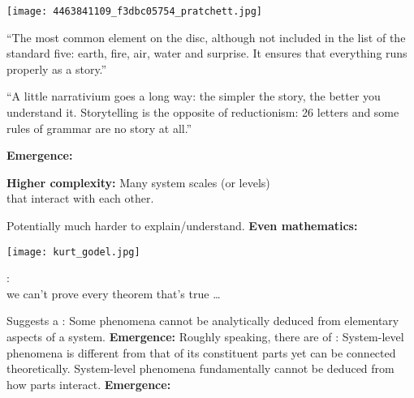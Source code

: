     \texttt{[image: 4463841109\_f3dbc05754\_pratchett.jpg]}
        
         
          ``The most common element on the disc, although not
          included in the list of the standard five: earth, fire, air,
          water and surprise. It ensures that everything runs properly
          as a story.''
        
          ``A little narrativium goes a long way: the simpler the story,
          the better you understand it. Storytelling is the opposite of
          reductionism: 26 letters and some rules of grammar are no story
          at all.''
    

  \textbf{Emergence:}

  \textbf{Higher complexity:}
      Many system scales (or levels) \\ 
      that
      interact with each other.
    
      Potentially much harder to explain/understand.
  \textbf{Even mathematics:\cite{foote2007a}}
      
      \texttt{[image: kurt\_godel.jpg]}
      
      :\\
      we can't prove every theorem that's true \ldots
  
      Suggests a :
      {
        Some phenomena cannot be analytically deduced
        from elementary aspects of a system.
      }
  \textbf{Emergence:}
    Roughly speaking, there are  of :  
  \textbf{}
    System-level phenomena is
    different from that of its constituent parts
    yet can be connected theoretically.
  \textbf{}
    System-level 
    phenomena fundamentally cannot
    be deduced from how parts interact.
  \textbf{Emergence:}
    
    
